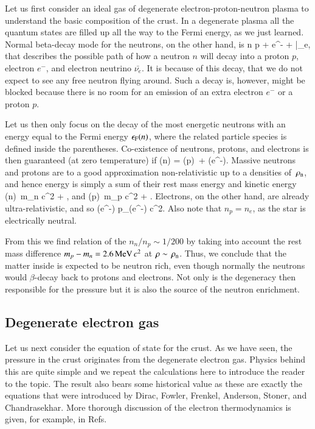 Let us first consider an ideal gas of degenerate electron-proton-neutron plasma to understand the basic composition of the crust.\cite[see e.g.][]{Phillips94}
In a degenerate plasma all the quantum states are filled up all the way to the Fermi energy, as we just learned.
Normal beta-decay mode for the neutrons, on the other hand, is 
\be
n \rightarrow p + e^{-} + \bar{\nu_{e}},
\ee
that describes the possible path of how a neutron $n$ will decay into a proton $p$, electron $e^{-}$, and electron neutrino $\bar{\nu_{e}}$.
It is because of this decay, that we do not expect to see any free neutron flying around.
Such a decay is, however, might be blocked because there is no room for an emission of an extra electron $e^{-}$ or a proton $p$.

Let us then only focus on the decay of the most energetic neutrons with an energy equal to the Fermi energy $\epsilon_{\mathrm{F}} (n)$, where the related particle species is defined inside the parentheses.
Co-existence of neutrons, protons, and electrons is then guaranteed (at zero temperature) if 
\be
\ef(n) = \ef(p) + \ef(e^{-}).
\ee
Massive neutrons and protons are to a good approximation non-relativistic up to a densities of $\, \rho_{\mathrm{n}} $, and hence energy is simply a sum of their rest mass energy and kinetic energy
\be
\ef(n) \approx m_n c^2 + ,
\ee
and
\be
\ef(p) \approx m_p c^2 + .
\ee
Electrons, on the other hand, are already ultra-relativistic, and so
\be
\ef(e^{-}) \approx p_{}(e^{-}) c^2.
\ee
Also note that $n_p = n_e$, as the star is electrically neutral.

From this we find relation of the $n_n/n_p \sim 1/200$ by taking into account the rest mass difference $m_p - m_n = 2.6 \, \mathrm{MeV}\, c^2$ at $\rho \sim \, \rho_{\mathrm{n}} $.
Thus, we conclude that the matter inside is expected to be neutron rich, even though normally the neutrons would $\beta$-decay back to protons and electrons.
Not only is the degeneracy then responsible for the pressure but it is also the source of the neutron enrichment. 


\subsection{Degenerate electron gas}
Let us next consider the equation of state for the crust.
As we have seen, the pressure in the crust originates from the degenerate electron gas.
Physics behind this are quite simple and we repeat the calculations here to introduce the reader to the topic.
The result also bears some historical value as these are exactly the equations that were introduced by Dirac\cite{Dirac25}, Fowler\cite{Fowler26}, Frenkel\cite{Frenkel28}, Anderson\cite{Anderson29}, Stoner\cite{Stoner30}, and Chandrasekhar\cite{Cha31}.%
More thorough discussion of the electron thermodynamics is given, for example, in Refs.\cite{Cha39, Schatzman58, Salpeter61, Tooper69, ZN71, LL80, Blinnikov87, YS89, HPY07}

